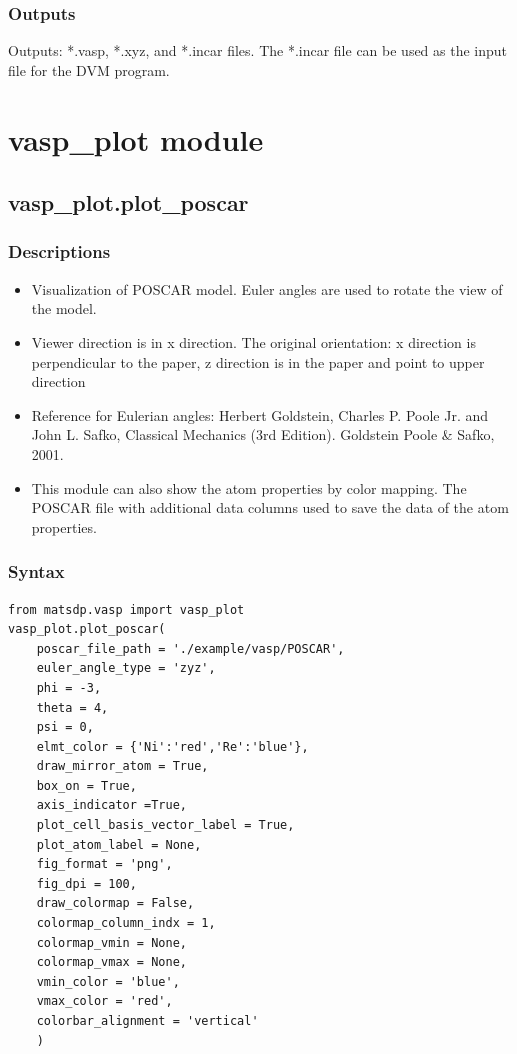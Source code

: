 \documentclass[12pt]{book}
\begin{document}
\subsubsection{Outputs}
Outputs: *.vasp, *.xyz, and *.incar files. The *.incar file can be used as the input file for the DVM program.

\section{vasp\_plot module}
\subsection{vasp\_plot.plot\_poscar}
\subsubsection{Descriptions}
\begin{itemize}
\item Visualization of POSCAR model. Euler angles are used to rotate the view of the model.
\item Viewer direction is in x direction. The original orientation: x direction is perpendicular to the paper, z direction is in the paper and point to upper direction
\item Reference for Eulerian angles: Herbert Goldstein, Charles P. Poole Jr. and John L. Safko, Classical Mechanics (3rd Edition). Goldstein Poole \& Safko, 2001.
\item This module can also show the atom properties by color mapping. The POSCAR file with additional data columns used to save the data of the atom properties.
\end{itemize}

\subsubsection{Syntax}
\begin{lstlisting}
from matsdp.vasp import vasp_plot
vasp_plot.plot_poscar(
    poscar_file_path = './example/vasp/POSCAR',
    euler_angle_type = 'zyz',
    phi = -3,
    theta = 4,
    psi = 0,
    elmt_color = {'Ni':'red','Re':'blue'},
    draw_mirror_atom = True,
    box_on = True,
    axis_indicator =True,
    plot_cell_basis_vector_label = True,
    plot_atom_label = None,
    fig_format = 'png',
    fig_dpi = 100,
    draw_colormap = False,
    colormap_column_indx = 1,
    colormap_vmin = None,
    colormap_vmax = None,
    vmin_color = 'blue',
    vmax_color = 'red',
    colorbar_alignment = 'vertical'
	)
\end{lstlisting}
\end{document}
